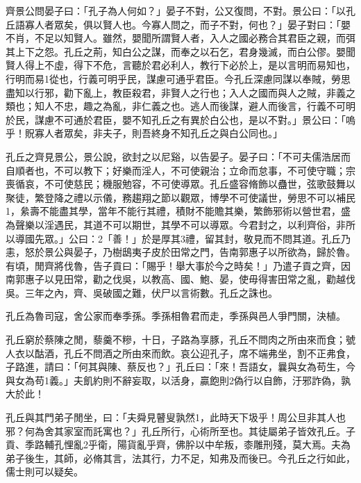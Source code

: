 \begin{pinyinscope}
齊景公問晏子曰：「孔子為人何如？」晏子不對，公又復問，不對。景公曰：「以孔丘語寡人者眾矣，俱以賢人也。今寡人問之，而子不對，何也？」晏子對曰：「嬰不肖，不足以知賢人。雖然，嬰聞所謂賢人者，入人之國必務合其君臣之親，而弭其上下之怨。孔丘之荊，知白公之謀，而奉之以石乞，君身幾滅，而白公僇。嬰聞賢人得上不虛，得下不危，言聽於君必利人，教行下必於上，是以言明而易知也，行明而易1從也，行義可明乎民，謀慮可通乎君臣。今孔丘深慮同謀以奉賊，勞思盡知以行邪，勸下亂上，教臣殺君，非賢人之行也；入人之國而與人之賊，非義之類也；知人不忠，趣之為亂，非仁義之也。逃人而後謀，避人而後言，行義不可明於民，謀慮不可通於君臣，嬰不知孔丘之有異於白公也，是以不對。」景公曰：「嗚乎！貺寡人者眾矣，非夫子，則吾終身不知孔丘之與白公同也。」

孔丘之齊見景公，景公說，欲封之以尼谿，以告晏子。晏子曰：「不可夫儒浩居而自順者也，不可以教下；好樂而淫人，不可使親治；立命而怠事，不可使守職；宗喪循哀，不可使慈民；機服勉容，不可使導眾。孔丘盛容脩飾以蠱世，弦歌鼓舞以聚徒，繁登降之禮以示儀，務趨翔之節以觀眾，博學不可使議世，勞思不可以補民1，絫壽不能盡其學，當年不能行其禮，積財不能贍其樂，繁飾邪術以營世君，盛為聲樂以淫遇民，其道不可以期世，其學不可以導眾。今君封之，以利齊俗，非所以導國先眾。」公曰：2「善！」於是厚其3禮，留其封，敬見而不問其道。孔丘乃恚，怒於景公與晏子，乃樹鴟夷子皮於田常之門，告南郭惠子以所欲為，歸於魯。有頃，閒齊將伐魯，告子貢曰：「賜乎！舉大事於今之時矣！」乃遣子貢之齊，因南郭惠子以見田常，勸之伐吳，以教高、國、鮑、晏，使毋得害田常之亂，勸越伐吳。三年之內，齊、吳破國之難，伏尸以言術數。孔丘之誅也。

孔丘為魯司寇，舍公家而奉季孫。季孫相魯君而走，季孫與邑人爭門關，決植。

孔丘窮於蔡陳之閒，藜羹不糝，十日，子路為享豚，孔丘不問肉之所由來而食；號人衣以酤酒，孔丘不問酒之所由來而飲。哀公迎孔子，席不端弗坐，割不正弗食，子路進，請曰：「何其與陳、蔡反也？」孔丘曰：「來！吾語女，曩與女為苟生，今與女為苟1義。」夫飢約則不辭妄取，以活身，贏飽則2偽行以自飾，汙邪詐偽，孰大於此！

孔丘與其門弟子閒坐，曰：「夫舜見瞽叟孰然1，此時天下圾乎！周公旦非其人也邪？何為舍其家室而託寓也？」孔丘所行，心術所至也。其徒屬弟子皆效孔丘。子貢、季路輔孔悝亂2乎衛，陽貨亂乎齊，佛肸以中牟叛，桼雕刑殘，莫大焉。夫為弟子後生，其師，必脩其言，法其行，力不足，知弗及而後已。今孔丘之行如此，儒士則可以疑矣。


\end{pinyinscope}
